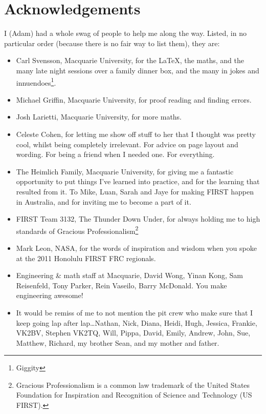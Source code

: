 \section{Acknowledgements}
\label{sec:Acknowledgements}
I (Adam) had a whole swag of people to help me along the way. Listed, in no
particular order (because there is no fair way to list them), they are:
\begin{itemize}
  \item Carl Svensson, Macquarie University, for the \LaTeX, the maths, and the
  many late night sessions over a family dinner box, and the many in jokes and
  innuendoes\footnote{Giggity}.
  \item Michael Griffin, Macquarie University, for proof reading and finding
  errors.
  \item Josh Larietti, Macquarie University, for more maths.
  \item Celeste Cohen, for letting me show off stuff to her that I thought
  was pretty cool, whilst being completely irrelevant. For advice on page
  layout and wording. For being a friend when I needed one. For everything.
  \item The Heimlich Family, Macquarie University, for giving me a fantastic
  opportunity to put things I've learned into practice, and for the learning
  that resulted from it. To Mike, Luan, Sarah and Jaye for making FIRST happen
  in Australia, and for inviting me to become a part of it.
  \item FIRST Team 3132, The Thunder Down Under, for always holding me to high
  standards of Gracious Professionalism\texttrademark\footnote{Gracious
  Professionalism is a common law trademark of the United States Foundation for
  Inspiration and Recognition of Science and Technology (US FIRST).}
  \item Mark Leon, NASA, for the words of inspiration and wisdom when you
  spoke at the 2011 Honolulu FIRST FRC regionals. 
  \item Engineering \& math staff at Macquarie, David Wong, Yinan Kong, Sam
  Reisenfeld, Tony Parker, Rein Vaseilo, Barry McDonald. You make engineering
  awesome!
  \item It would be remiss of me to not mention the pit crew who make
  sure that I keep going lap after lap\ldots Nathan, Nick, Diana, Heidi, Hugh,
  Jessica, Frankie, VK2BV, Stephen VK2TQ, Will, Pippa, David, Emily, Andrew,
  John, Sue, Matthew, Richard, my brother Sean, and my mother and father.
\end{itemize}


%
